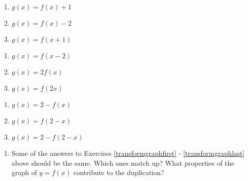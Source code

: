 \begin{multicols}{3}
\begin{enumerate}
\setcounter{enumi}{\value{HW}}

\item $g(x) = f(x) + 1$ \label{transformgraphfirst}
\item $g(x) = f(x) - 2$
\item $g(x) = f(x+1)$

\setcounter{HW}{\value{enumi}}
\end{enumerate}
\end{multicols}

\begin{multicols}{3}
\begin{enumerate}
\setcounter{enumi}{\value{HW}}

\item $g(x) = f(x - 2)$
\item $g(x) = 2f(x)$
\item $g(x) = f(2x)$

\setcounter{HW}{\value{enumi}}
\end{enumerate}
\end{multicols}

\begin{multicols}{3}
\begin{enumerate}
\setcounter{enumi}{\value{HW}}

\item $g(x) = 2 - f(x)$
\item $g(x) = f(2-x)$
\item $g(x) = 2-f(2-x)$ \label{transformgraphlast}

\setcounter{HW}{\value{enumi}}
\end{enumerate}
\end{multicols}


\begin{enumerate}
\setcounter{enumi}{\value{HW}}

\item Some of the answers to Exercises \ref{transformgraphfirst} - \ref{transformgraphlast} above should be the same.  Which ones match up?  What properties of the graph of $y=f(x)$ contribute to the duplication?

\setcounter{HW}{\value{enumi}}
\end{enumerate}

\newpage

